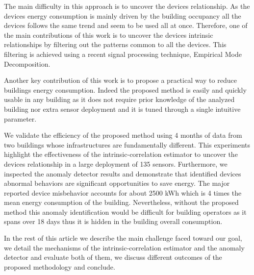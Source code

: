 The main difficulty in this approach is to uncover the devices relationship. 
As the devices energy consumption is mainly driven by the building occupancy all the devices follows the same trend and seem to be used all at once.
Therefore, one of the main contributions of this work is to uncover the devices intrinsic relationships by filtering out the patterns common to all the devices.
This filtering is achieved using a recent signal processing technique, Empirical Mode Decomposition.

Another key contribution of this work is to propose a practical way to reduce buildings energy consumption.
Indeed the proposed method is easily and quickly usable in any building as it does not require prior knowledge of the analyzed building nor extra sensor deployment and it is tuned through a single intuitive parameter.

We validate the efficiency of the proposed method using 4 months of data from two buildings whose infrastructures are fundamentally different.
This experiments highlight the effectiveness of the intrinsic-correlation estimator to uncover the devices relationship in a large deployment of 135 sensors.
Furthermore, we inspected the anomaly detector results and demonstrate that identified devices abnormal behaviors are significant opportunities to save energy.
The major reported device misbehavior accounts for about 2500 kWh which is 4 times the mean energy consumption of the building.
Nevertheless, without the proposed method this anomaly identification would be difficult for building operators as it spans over 18 days thus it is hidden in the building overall consumption.

In the rest of this article we describe the main challenge faced toward our goal, we detail the mechanisms of the intrinsic-correlation estimator and the anomaly detector and evaluate both of them, we discuss different outcomes of the proposed methodology and conclude.
